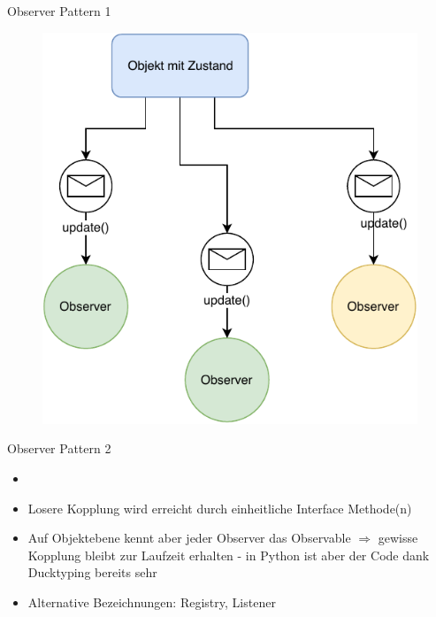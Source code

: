 \begin{frame}{Observer Pattern 1}
       \begin{figure}[!htb]
        \includegraphics[scale=0.67]{6-python3/img/observer}  
    \end{figure}
   
\end{frame}

\begin{frame}{Observer Pattern 2}
        \begin{itemize}
        \setlength{\itemindent}{1.1in}
        \item [\textbf{Observer Pattern}]
    \end{itemize}

    \begin{itemize}
        \item Losere Kopplung wird erreicht durch einheitliche Interface Methode(n)  
        \item Auf Objektebene kennt aber jeder Observer das Observable   $\Rightarrow$ gewisse Kopplung bleibt zur Laufzeit erhalten - in Python ist aber der Code dank Ducktyping bereits sehr 
        \item Alternative Bezeichnungen: Registry, Listener
    \end{itemize}   
\end{frame}

